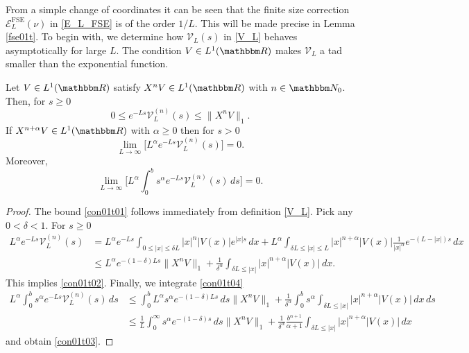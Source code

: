 From a simple change of coordinates it can be seen that the
finite size correction $\mathcal{E}_L^{\text{FSE}}(\nu)$ in \eqref{E_L_FSE} is of the order $1/L$.
This will be made precise in Lemma \ref{fse01t}. To begin with,
we determine how $\mathcal{V}_L(s)$ in \eqref{V_L} behaves asymptotically for large $L$. 
The condition $V\in L^1(\R)$ makes $\mathcal{V}_L$ a tad smaller than the exponential function.

\begin{lemma}\label{con01t}
Let $V\in L^1(\R)$ satisfy $X^nV\in L^1(\R)$ with $n\in\N_0$. 
Then, for $s\geq 0$
\begin{equation}\label{con01t01}
  0 \leq e^{-Ls} \mathcal{V}_L^{(n)}(s) \leq \|X^nV\|_1 .
\end{equation}
If $X^{n+\alpha} V\in L^1(\R)$ with $\alpha\geq 0$ then for $s>0$
\begin{equation}\label{con01t02}
  \lim_{L\to\infty} \big[ L^\alpha e^{-Ls} \mathcal{V}_L^{(n)}(s) \big] =0 .
\end{equation}
Moreover,
\begin{equation}\label{con01t03}
  \lim_{L\to\infty} \big[ L^\alpha \int_0^b s^\alpha e^{-Ls} \mathcal{V}_L^{(n)}(s)\, ds \big] = 0 .
\end{equation}
\end{lemma}
\begin{proof}
The bound \eqref{con01t01} follows immediately from definition \eqref{V_L}.
Pick any $0<\delta<1$. For $s\geq 0$
\begin{equation}\label{con01t04}
\begin{split}
 L^\alpha e^{-Ls} \mathcal{V}_L^{(n)}(s) 
   & = L^\alpha e^{-Ls} \int_{0\leq |x|\leq\delta L}|x|^n |V(x)| e^{|x|s}\, dx 
          + L^\alpha\int_{\delta L\leq |x| \leq L} |x|^{n+\alpha} |V(x)| \frac{1}{|x|^\alpha} e^{-(L-|x|)s}\, dx\\
   & \leq L^\alpha e^{-(1-\delta)Ls} \|X^nV\|_1 + \frac{1}{\delta^\alpha} \int_{\delta L\leq |x|} |x|^{n+\alpha} |V(x)|\, dx .
\end{split}
\end{equation}
This implies \eqref{con01t02}. Finally, we integrate \eqref{con01t04}
\begin{equation*}
\begin{split}
  L^\alpha\int_0^b s^\alpha e^{-Ls}\mathcal{V}_L^{(n)}(s)\, ds
    & \leq \int_0^b L^\alpha s^\alpha e^{-(1-\delta)Ls}\, ds \|X^nV\|_1 
          + \frac{1}{\delta^\alpha} \int_0^b s^\alpha \int_{\delta L\leq |x|} |x|^{n+\alpha} |V(x)|\, dx\, ds\\
    & \leq \frac{1}{L}\int_0^\infty s^\alpha e^{-(1-\delta)s}\, ds \|X^nV\|_1 
               + \frac{1}{\delta^\alpha}\frac{b^{\alpha+1}}{\alpha+1} \int_{\delta L\leq |x|} |x|^{n+\alpha} |V(x)|\, dx
\end{split}
\end{equation*}
and obtain \eqref{con01t03}.
\end{proof}


